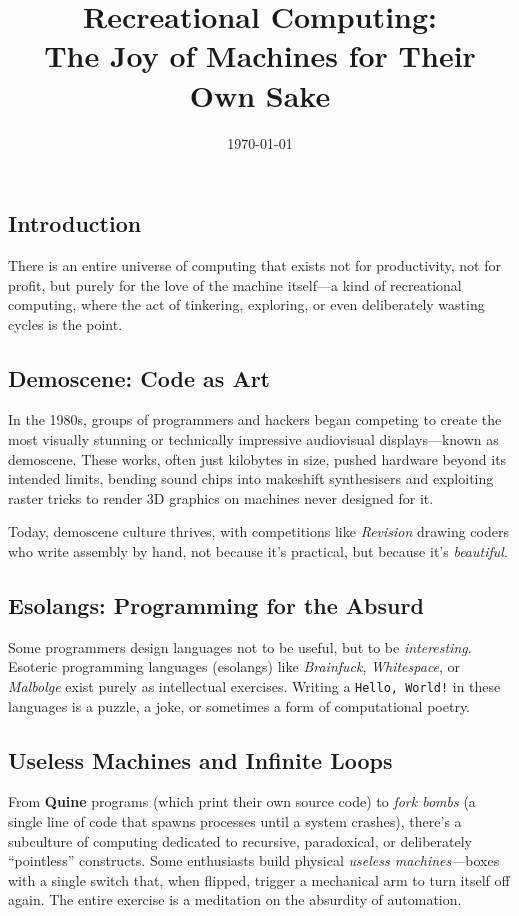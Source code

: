 \documentclass[12pt]{article}
\title{Recreational Computing: \\The Joy of Machines for Their Own Sake}
\author{}
\date{\today}
\newcommand{\candidate}[2]{#1} %
\begin{document}
\maketitle

\subsection*{Introduction}
There is an entire universe of computing that exists not for productivity, not for profit, but purely for the love of the machine itself---a kind of \candidate{recreational computing}{\textit{recreational computing}}, where the act of tinkering, exploring, or even deliberately wasting cycles is the point.

\subsection*{Demoscene: Code as Art}
In the 1980s, groups of programmers and hackers began competing to create the most visually stunning or technically impressive audiovisual displays---known as \candidate{demoscene}{demos}. These works, often just kilobytes in size, pushed hardware beyond its intended limits, bending sound chips into makeshift synthesisers and exploiting raster tricks to render 3D graphics on machines never designed for it. 

Today, demoscene culture thrives, with competitions like \textit{Revision} drawing coders who write assembly by hand, not because it’s practical, but because it’s \textit{beautiful}.

\subsection*{Esolangs: Programming for the Absurd}
Some programmers design languages not to be useful, but to be \textit{interesting}. Esoteric programming languages (esolangs) like \textit{Brainfuck}, \textit{Whitespace}, or \textit{Malbolge} exist purely as intellectual exercises. Writing a \texttt{Hello, World!} in these languages is a puzzle, a joke, or sometimes a form of computational poetry.

\subsection*{Useless Machines and Infinite Loops}
From \textbf{Quine} programs (which print their own source code) to \textit{fork bombs} (a single line of code that spawns processes until a system crashes), there’s a subculture of computing dedicated to recursive, paradoxical, or deliberately ``pointless'' constructs. Some enthusiasts build physical \textit{useless machines}---boxes with a single switch that, when flipped, trigger a mechanical arm to turn itself off again. The entire exercise is a meditation on the absurdity of automation.
\end{document}
